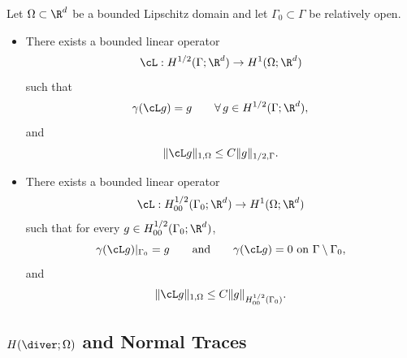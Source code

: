 \begin{theorem}\label{thm:lifting}
	Let $\Omega\subset\R^d$ be a bounded Lipschitz domain and let $\Gamma_0\subset\Gamma$ be relatively open.

	\begin{itemize}
		\item[i)] There exists a bounded linear operator
		      \begin{equation*}
			      \cL:H^{1/2}(\Gamma;\R^d)\to H^1(\Omega;\R^d)
		      \end{equation*}
		      such that
		      \begin{equation*}
			      \gamma(\cL g)=g
			      \qquad\forall\,g\in H^{1/2}(\Gamma;\R^d),
		      \end{equation*}
		      and
		      \begin{equation*}
			      \|\cL g\|_{1,\Omega}\le C\|g\|_{1/2,\Gamma}.
		      \end{equation*}

		\item[ii)] There exists a bounded linear operator
		      \begin{equation*}
			      \cL:H^{1/2}_{00}(\Gamma_0;\R^d)\to H^1(\Omega;\R^d)
		      \end{equation*}
		      such that for every $g\in H^{1/2}_{00}(\Gamma_0;\R^d)$,
		      \begin{equation*}
			      \gamma(\cL g)|_{\Gamma_0}=g
			      \qquad\text{and}\qquad
			      \gamma(\cL g)=0\ \text{on }\Gamma\setminus\Gamma_0,
		      \end{equation*}
		      and
		      \begin{equation*}
			      \|\cL g\|_{1,\Omega}\le C\|g\|_{H^{1/2}_{00}(\Gamma_0)}.
		      \end{equation*}
	\end{itemize}
\end{theorem}

\subsection{\texorpdfstring{$H(\diver;\Omega)$}{Hdiv} and Normal Traces}\label{subsec:Hdiv}

